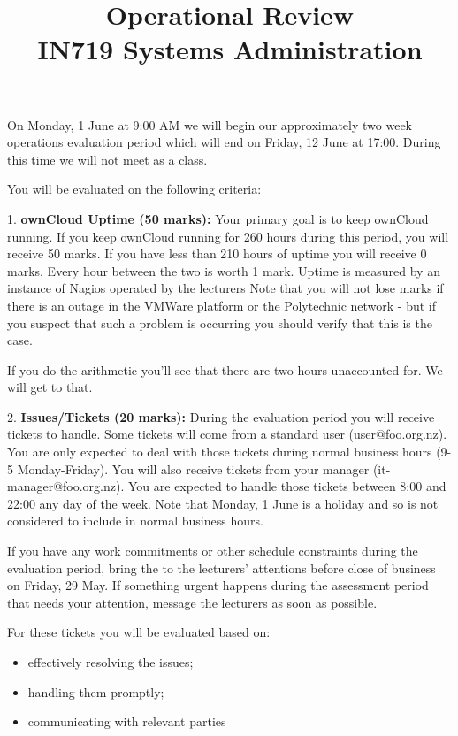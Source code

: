\documentclass{article}   	%
\title{Operational Review\\ IN719 Systems Administration}
\date{}							%
\begin{document}
\maketitle


On Monday, 1 June at 9:00 AM we will begin our approximately two week operations evaluation period which will end on Friday, 12 June at 17:00.  During this time we will not meet as a class.

You will be evaluated on the following criteria:

1.  \textbf{ownCloud Uptime (50 marks):}  Your primary goal is to keep ownCloud running.  If you keep ownCloud running for 260 hours during this period, you will receive 50 marks.  If you have less than 210 hours of uptime you will receive 0 marks.  Every hour between the two is worth 1 mark.  Uptime is measured by an instance of Nagios operated by the lecturers  Note that you will not lose marks if there is an outage in the VMWare platform or the Polytechnic network - but if you suspect that such a problem is occurring you should verify that this is the case.

If you do the arithmetic you'll see that there are two hours unaccounted for.  We will get to that.

2.  \textbf{Issues/Tickets (20 marks):}  During the evaluation period you will receive tickets to handle.  Some tickets will come from a standard user (user@foo.org.nz).  You are only expected to deal with those tickets during normal business hours (9-5 Monday-Friday).  You will also receive tickets from your manager (it-manager@foo.org.nz).  You are expected to handle those tickets between 8:00 and 22:00 any day of the week.  Note that Monday, 1 June is a holiday and so is not considered to include in normal business hours.

If you have any work commitments or other schedule constraints during the evaluation period, bring the to the lecturers' attentions before close of business on Friday, 29 May. If something urgent happens during the assessment period that needs your attention, message the lecturers as soon as possible.

For these tickets you will be evaluated based on:
 
 \begin{itemize}
   \item effectively resolving the issues;
   \item handling them promptly;
   \item communicating with relevant parties
 \end{itemize}
 
\end{document}
